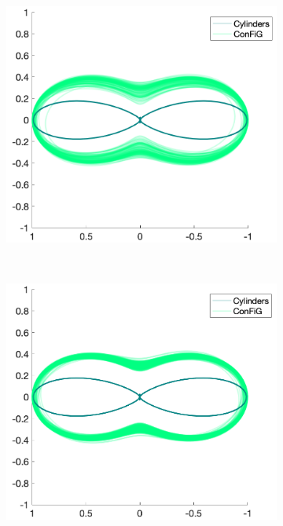 \begin{figure}
  \centering
  \begin{subfigure}[]{0.32\textwidth}
    \includegraphics[width=\textwidth]{figures/frf_experiment/kappa_2_b_3000.png}
    \caption{}
  \end{subfigure}
  ~
  \begin{subfigure}[]{0.32\textwidth}
    \includegraphics[width=\textwidth]{figures/frf_experiment/kappa_6_b_3000.png}

\end{subfigure}
\end{figure}
